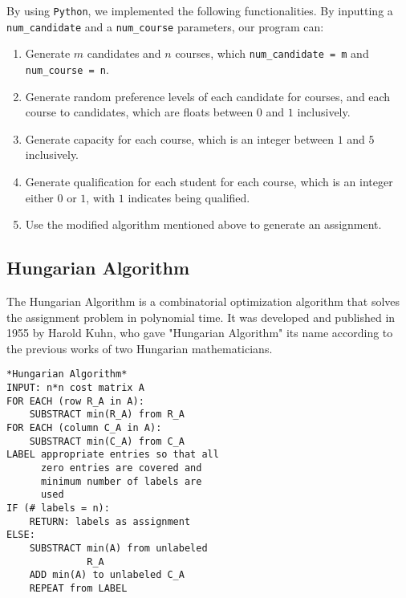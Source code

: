 \documentclass[twoside,twocolumn]{article}
\begin{document}
    By using \verb|Python|, we implemented the following functionalities. 
    By inputting a \verb|num_candidate| and a \verb|num_course| parameters, our program can:
    \begin{enumerate}
        \item Generate $m$ candidates and $n$ courses, which \verb|num_candidate = m| and \verb|num_course = n|.
        \item Generate random preference levels of each candidate for courses, and each course to candidates, which are
        floats between $0$ and $1$ inclusively.
        \item Generate capacity for each course, which is an integer between $1$ and $5$ inclusively.
        \item Generate qualification for each student for each course, which is an integer either $0$ or $1$, with $1$ indicates
        being qualified.
        \item Use the modified algorithm mentioned above to generate an assignment.
    \end{enumerate}

    \subsection{Hungarian Algorithm}
    The Hungarian Algorithm is a combinatorial optimization algorithm that solves the assignment problem in polynomial time.
    It was developed and published in 1955 by Harold Kuhn, who gave "Hungarian Algorithm" its name according to the previous works
    of two Hungarian mathematicians.
    \begin{lstlisting}
*Hungarian Algorithm*
INPUT: n*n cost matrix A
FOR EACH (row R_A in A):
    SUBSTRACT min(R_A) from R_A
FOR EACH (column C_A in A):
    SUBSTRACT min(C_A) from C_A
LABEL appropriate entries so that all
      zero entries are covered and 
      minimum number of labels are 
      used
IF (# labels = n):
    RETURN: labels as assignment    
ELSE:
    SUBSTRACT min(A) from unlabeled 
              R_A
    ADD min(A) to unlabeled C_A
    REPEAT from LABEL


    
    \end{lstlisting}
\end{document}
